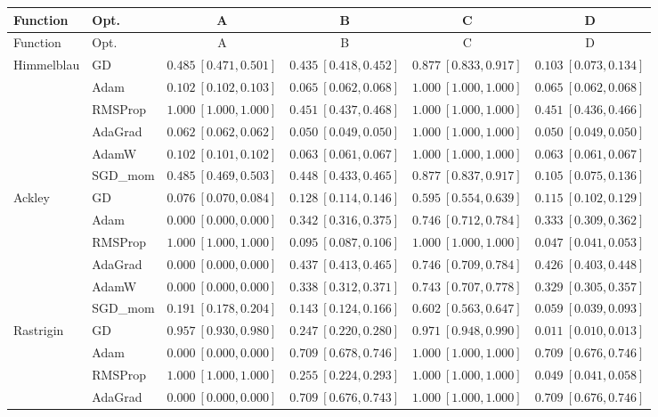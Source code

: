 \documentclass[11pt]{article}
\begin{document}
{\small
\begin{longtable}{llcccc}
\toprule
Function & Opt. & A & B & C & D \\
\midrule
\endfirsthead
\toprule
Function & Opt. & A & B & C & D \\
\midrule
\endhead
Himmelblau & GD & $0.485\ [0.471,0.501]$ & $0.435\ [0.418,0.452]$ & $0.877\ [0.833,0.917]$ & $0.103\ [0.073,0.134]$ \\
 & Adam & $0.102\ [0.102,0.103]$ & $0.065\ [0.062,0.068]$ & $1.000\ [1.000,1.000]$ & $0.065\ [0.062,0.068]$ \\
 & RMSProp & $1.000\ [1.000,1.000]$ & $0.451\ [0.437,0.468]$ & $1.000\ [1.000,1.000]$ & $0.451\ [0.436,0.466]$ \\
 & AdaGrad & $0.062\ [0.062,0.062]$ & $0.050\ [0.049,0.050]$ & $1.000\ [1.000,1.000]$ & $0.050\ [0.049,0.050]$ \\
 & AdamW & $0.102\ [0.101,0.102]$ & $0.063\ [0.061,0.067]$ & $1.000\ [1.000,1.000]$ & $0.063\ [0.061,0.067]$ \\
 & SGD\_mom & $0.485\ [0.469,0.503]$ & $0.448\ [0.433,0.465]$ & $0.877\ [0.837,0.917]$ & $0.105\ [0.075,0.136]$ \\
Ackley & GD & $0.076\ [0.070,0.084]$ & $0.128\ [0.114,0.146]$ & $0.595\ [0.554,0.639]$ & $0.115\ [0.102,0.129]$ \\
 & Adam & $0.000\ [0.000,0.000]$ & $0.342\ [0.316,0.375]$ & $0.746\ [0.712,0.784]$ & $0.333\ [0.309,0.362]$ \\
 & RMSProp & $1.000\ [1.000,1.000]$ & $0.095\ [0.087,0.106]$ & $1.000\ [1.000,1.000]$ & $0.047\ [0.041,0.053]$ \\
 & AdaGrad & $0.000\ [0.000,0.000]$ & $0.437\ [0.413,0.465]$ & $0.746\ [0.709,0.784]$ & $0.426\ [0.403,0.448]$ \\
 & AdamW & $0.000\ [0.000,0.000]$ & $0.338\ [0.312,0.371]$ & $0.743\ [0.707,0.778]$ & $0.329\ [0.305,0.357]$ \\
 & SGD\_mom & $0.191\ [0.178,0.204]$ & $0.143\ [0.124,0.166]$ & $0.602\ [0.563,0.647]$ & $0.059\ [0.039,0.093]$ \\
Rastrigin & GD & $0.957\ [0.930,0.980]$ & $0.247\ [0.220,0.280]$ & $0.971\ [0.948,0.990]$ & $0.011\ [0.010,0.013]$ \\
 & Adam & $0.000\ [0.000,0.000]$ & $0.709\ [0.678,0.746]$ & $1.000\ [1.000,1.000]$ & $0.709\ [0.676,0.746]$ \\
 & RMSProp & $1.000\ [1.000,1.000]$ & $0.255\ [0.224,0.293]$ & $1.000\ [1.000,1.000]$ & $0.049\ [0.041,0.058]$ \\
 & AdaGrad & $0.000\ [0.000,0.000]$ & $0.709\ [0.676,0.743]$ & $1.000\ [1.000,1.000]$ & $0.709\ [0.676,0.746]$ \\

\end{longtable}}
\end{document}
